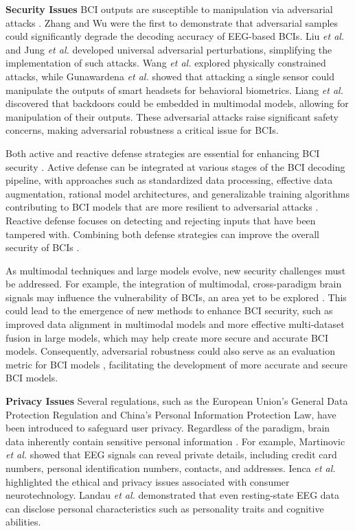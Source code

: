 \documentclass[journal]{IEEEtran}
\begin{document}
\textbf{Security Issues} BCI outputs are susceptible to manipulation via adversarial attacks \cite{Zhang2021a}. Zhang and Wu \cite{Zhang2019} were the first to demonstrate that adversarial samples could significantly degrade the decoding accuracy of EEG-based BCIs. Liu \emph{et al.} \cite{Liu2021} and Jung \emph{et al.} \cite{Jung2023} developed universal adversarial perturbations, simplifying the implementation of such attacks. Wang \emph{et al.} \cite{Wang2022a} explored physically constrained attacks, while Gunawardena \emph{et al.} \cite{Gunawardena2024} showed that attacking a single sensor could manipulate the outputs of smart headsets for behavioral biometrics. Liang \emph{et al.} \cite{Liang2024} discovered that backdoors could be embedded in multimodal models, allowing for manipulation of their outputs. These adversarial attacks raise significant safety concerns, making adversarial robustness a critical issue for BCIs.

Both active and reactive defense strategies are essential for enhancing BCI security \cite{Gunawardena2024}. Active defense can be integrated at various stages of the BCI decoding pipeline, with approaches such as standardized data processing, effective data augmentation, rational model architectures, and generalizable training algorithms contributing to BCI models that are more resilient to adversarial attacks \cite{Chen2024ABAT, Croce2021}. Reactive defense focuses on detecting and rejecting inputs that have been tampered with. Combining both defense strategies can improve the overall security of BCIs \cite{Gunawardena2024}.

As multimodal techniques and large models evolve, new security challenges must be addressed. For example, the integration of multimodal, cross-paradigm brain signals may influence the vulnerability of BCIs, an area yet to be explored \cite{Liang2024}. This could lead to the emergence of new methods to enhance BCI security, such as improved data alignment in multimodal models and more effective multi-dataset fusion in large models, which may help create more secure and accurate BCI models. Consequently, adversarial robustness could also serve as an evaluation metric for BCI models \cite{Meng2023}, facilitating the development of more accurate and secure BCI models.

\textbf{Privacy Issues} Several regulations, such as the European Union's General Data Protection Regulation and China's Personal Information Protection Law, have been introduced to safeguard user privacy. Regardless of the paradigm, brain data inherently contain sensitive personal information \cite{Xia2023}. For example, Martinovic \emph{et al.} \cite{Martinovic2012} showed that EEG signals can reveal private details, including credit card numbers, personal identification numbers, contacts, and addresses. Ienca \emph{et al.} \cite{Ienca2018} highlighted the ethical and privacy issues associated with consumer neurotechnology. Landau \emph{et al.} \cite{Landau2020} demonstrated that even resting-state EEG data can disclose personal characteristics such as personality traits and cognitive abilities.
\end{document}
